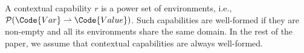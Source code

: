 \begin{definition}\label{def:contextual-capability}
A contextual capability $r$ is a power set of environments,
i.e., $\mathcal{P}(\Code{Var} \rightharpoonup
\Code{Value})$. Such capabilities are well-formed if they are
non-empty and all its environments share the same domain.
In the rest of the paper,
we assume that contextual capabilities are always well-formed.  
\end{definition}

